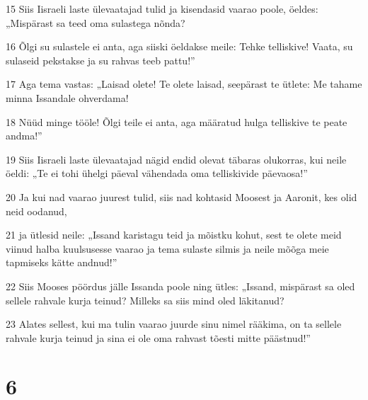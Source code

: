 \par 15 Siis Iisraeli laste ülevaatajad tulid ja kisendasid vaarao poole, öeldes: „Mispärast sa teed oma sulastega nõnda?
\par 16 Õlgi su sulastele ei anta, aga siiski öeldakse meile: Tehke telliskive! Vaata, su sulaseid pekstakse ja su rahvas teeb pattu!”
\par 17 Aga tema vastas: „Laisad olete! Te olete laisad, seepärast te ütlete: Me tahame minna Issandale ohverdama!
\par 18 Nüüd minge tööle! Õlgi teile ei anta, aga määratud hulga telliskive te peate andma!”
\par 19 Siis Iisraeli laste ülevaatajad nägid endid olevat täbaras olukorras, kui neile öeldi: „Te ei tohi ühelgi päeval vähendada oma telliskivide päevaosa!”
\par 20 Ja kui nad vaarao juurest tulid, siis nad kohtasid Moosest ja Aaronit, kes olid neid oodanud,
\par 21 ja ütlesid neile: „Issand karistagu teid ja mõistku kohut, sest te olete meid viinud halba kuulsusesse vaarao ja tema sulaste silmis ja neile mõõga meie tapmiseks kätte andnud!”
\par 22 Siis Mooses pöördus jälle Issanda poole ning ütles: „Issand, mispärast sa oled sellele rahvale kurja teinud? Milleks sa siis mind oled läkitanud?
\par 23 Alates sellest, kui ma tulin vaarao juurde sinu nimel rääkima, on ta sellele rahvale kurja teinud ja sina ei ole oma rahvast tõesti mitte päästnud!”

\chapter{6}

